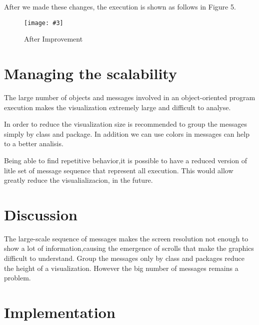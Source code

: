\documentclass{sig-alternate}
\newcommand{\largefig}[4]{
	\begin{figure*}[#1]
		\centering
		\texttt{[image: \#3]}
		\caption{\label{fig:#3}#4}
	\end{figure*}}
\newcommand{\seclabel}[1]{\label{sec:#1}}
\begin{document}
After we made these changes, the execution is shown as follows in Figure 5.
\largefig{}{1.0}{Mondrian2}{After Improvement}


\section{Managing the scalability}\seclabel{scalability}

The large number of objects and messages involved in an object-oriented program execution makes the visualization extremely large and difficult to analyse.

In order to reduce the visualization size is recommended to group the messages simply by class and package. In addition we can use colors in messages can help to a better analisis.

Being able to find repetitive behavior,it is possible to have a reduced version of litle set of message sequence that represent all execution. This would allow greatly reduce the visualializacion, in the future.

\section{Discussion}\seclabel{discussion}

The large-scale sequence of messages makes the screen resolution not enough to show a lot of information,causing the emergence of scrolls that make the graphics difficult to understand. Group the messages only by class and packages reduce the height of a visualization. However the big number of messages remains a problem.


\section{Implementation}\seclabel{implementation}
\end{document}
